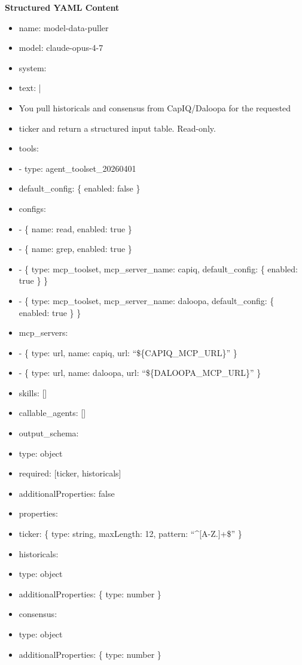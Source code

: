 \documentclass[11pt]{article}
\begin{document}
\textbf{Structured YAML Content}
\begin{itemize}[leftmargin=*,itemsep=2pt,topsep=2pt]
\item {} name: model-data-puller
\item {} model: claude-opus-4-7
\item {} system:
\item {} text: |
\item {} You pull historicals and consensus from CapIQ/Daloopa for the requested
\item {} ticker and return a structured input table. Read-only.
\item {} tools:
\item {} - type: agent\_\allowbreak{}toolset\_\allowbreak{}20260401
\item {} default\_\allowbreak{}config: \{ enabled: false \}
\item {} configs:
\item {} - \{ name: read, enabled: true \}
\item {} - \{ name: grep, enabled: true \}
\item {} - \{ type: mcp\_\allowbreak{}toolset, mcp\_\allowbreak{}server\_\allowbreak{}name: capiq, default\_\allowbreak{}config: \{ enabled: true \} \}
\item {} - \{ type: mcp\_\allowbreak{}toolset, mcp\_\allowbreak{}server\_\allowbreak{}name: daloopa, default\_\allowbreak{}config: \{ enabled: true \} \}
\item {} mcp\_\allowbreak{}servers:
\item {} - \{ type: url, name: capiq, url: ``\$\{CAPIQ\_\allowbreak{}MCP\_\allowbreak{}URL\}'' \}
\item {} - \{ type: url, name: daloopa, url: ``\$\{DALOOPA\_\allowbreak{}MCP\_\allowbreak{}URL\}'' \}
\item {} skills: []
\item {} callable\_\allowbreak{}agents: []
\item {} output\_\allowbreak{}schema:
\item {} type: object
\item {} required: [ticker, historicals]
\item {} additionalProperties: false
\item {} properties:
\item {} ticker: \{ type: string, maxLength: 12, pattern: ``\textasciicircum{}[A-Z.]+\$'' \}
\item {} historicals:
\item {} type: object
\item {} additionalProperties: \{ type: number \}
\item {} consensus:
\item {} type: object
\item {} additionalProperties: \{ type: number \}
\end{itemize}
\end{document}
